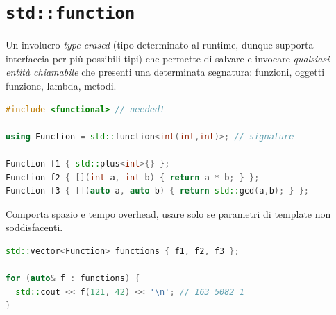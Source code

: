 \documentclass[10pt, oneside]{book}
\begin{document}
\section{\texttt{std::function}}
Un involucro \textit{type-erased} (tipo determinato al runtime, dunque supporta interfaccia per più possibili tipi) che permette di salvare e invocare \textit{qualsiasi entità chiamabile} che presenti una determinata segnatura: funzioni, oggetti funzione, lambda, metodi.\begin{lstlisting}[language=C++]
#include <functional> // needed!

using Function = std::function<int(int,int)>; // signature

Function f1 { std::plus<int>{} };
Function f2 { [](int a, int b) { return a * b; } };
Function f3 { [](auto a, auto b) { return std::gcd(a,b); } };
\end{lstlisting}
Comporta spazio e tempo overhead, usare solo se parametri di template non soddisfacenti.
\begin{lstlisting}[language=C++]
std::vector<Function> functions { f1, f2, f3 };

for (auto& f : functions) {
  std::cout << f(121, 42) << '\n'; // 163 5082 1
}
\end{lstlisting}
\end{document}
